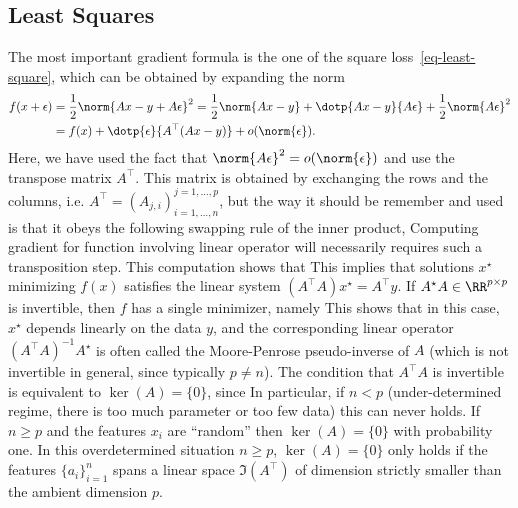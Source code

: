 \subsection{Least Squares}

The most important gradient formula is the one of the square loss~\eqref{eq-least-square}, which can be obtained by expanding the norm
\begin{align*}
	f(x+\epsilon) &= \frac{1}{2}\norm{Ax-y+A\epsilon}^2 = \frac{1}{2}\norm{Ax-y} + \dotp{Ax-y}{A\epsilon} + \frac{1}{2}\norm{A\epsilon}^2 \\
		&=f(x) + \dotp{\epsilon}{A^\top(Ax-y)} + o(\norm{\epsilon}).
\end{align*} 
Here, we have used the fact that $\norm{A\epsilon}^2 = o(\norm{\epsilon})$ and use the transpose matrix $A^\top$. 
%
This matrix is obtained by exchanging the rows and the columns, i.e. $A^\top = (A_{j,i})_{i=1,\ldots,n}^{j=1,\ldots,p}$, but the way it should be remember and used is that it obeys the following swapping rule of the inner product, 
Computing gradient for function involving linear operator will necessarily requires such a transposition step.
%
This computation shows that
This implies that solutions $x^\star$ minimizing $f(x)$ satisfies the linear system $(A^\top A) x^\star = A^\top y$. 
%
If $A^\star A \in \RR^{p \times p}$ is invertible, then $f$ has a single minimizer, namely  
This shows that in this case, $x^\star$ depends linearly on the data $y$, and the corresponding linear operator $(A^\top A)^{-1} A^\star$ is often called the Moore-Penrose pseudo-inverse of $A$ (which is not invertible in general, since typically $p \neq n$). 
%
The condition that $A^\top A$ is invertible is equivalent to $\ker(A)=\{0\}$, since 
In particular, if $n<p$ (under-determined regime, there is too much parameter or too few data) this can never holds. If $n \geq p$ and the features $x_i$ are ``random'' then $\ker(A)=\{0\}$ with probability one. In this overdetermined situation $n \geq p$,  $\ker(A)=\{0\}$ only holds if the features $\{a_i\}_{i=1}^n$ spans a linear space $\Im(A^\top)$ of dimension strictly smaller than the ambient dimension $p$.
 
